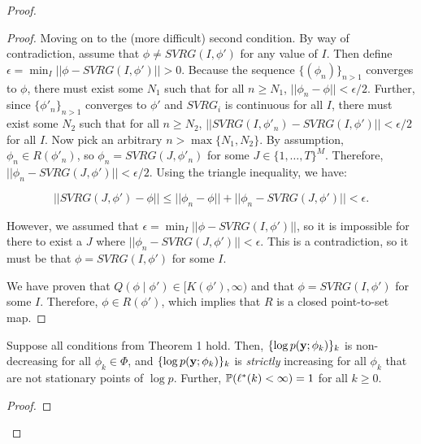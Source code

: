 \begin{proof}
\begin{proof}
    Moving on to the (more difficult) second condition. By way of contradiction, assume that $\phi \neq SVRG(I,\phi')$ for any value of $I$. Then define $\epsilon = \min_I ||\phi - SVRG(I,\phi')|| > 0$. Because the sequence $\{(\phi_n)\}_{n>1}$ converges to $\phi$, there must exist some $N_1$ such that for all $n \geq N_1$, $||\phi_{n} - \phi|| < \epsilon/2$. Further, since $\{\phi'_{n}\}_{n>1}$ converges to $\phi'$ and $SVRG_i$ is continuous for all $I$, there must exist some $N_2$ such that for all $n \geq N_2$, $||SVRG(I,\phi'_{n}) - SVRG(I,\phi')|| < \epsilon/2$ for all $I$. Now pick an arbitrary $n > \max\{N_1,N_2\}$. By assumption, $\phi_{n} \in R(\phi'_{n})$, so $\phi_{n} = SVRG(J,\phi'_{n})$ for some $J \in \{1,\ldots,T\}^M$. Therefore, $||\phi_{n} - SVRG(J,\phi')|| < \epsilon/2$. Using the triangle inequality, we have:
    
    $$||SVRG(J,\phi') - \phi|| \leq ||\phi_{n} - \phi|| + ||\phi_{n} - SVRG(J,\phi')|| < \epsilon.$$
    
    However, we assumed that $\epsilon = \min_I ||\phi - SVRG(I,\phi')||$, so it is impossible for there to exist a $J$ where $||\phi_{n} - SVRG(J,\phi')|| < \epsilon$. This is a contradiction, so it must be that $\phi = SVRG(I,\phi')$ for some $I$.
    
    We have proven that $Q(\phi \mid \phi') \in [K(\phi'),\infty)$ and that $\phi = SVRG(I,\phi')$ for some $I$. Therefore, $\phi \in R(\phi')$, which implies that $R$ is a closed point-to-set map.
\end{proof}

\begin{lemma}
    Suppose all conditions from Theorem 1 hold. Then, $\{\log p(\mathbf{y};\phi_k)\}_{k}$ is non-decreasing for all $\phi_k \in \Phi$, and $\{\log p(\mathbf{y};\phi_k)\}_{k}$ is \textit{strictly} increasing for all $\phi_k$ that are not stationary points of $\log p$. Further, $\mathbb{P}(\ell^*(k) < \infty) = 1$ for all $k \geq 0$.
\end{lemma}

\begin{proof}


\end{proof}
\end{proof}
